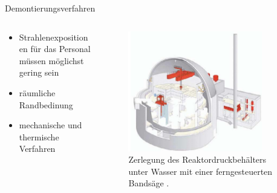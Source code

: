 \begin{frame}{Demontierungsverfahren}
  \begin{columns}

    \begin{column}{0.48\textwidth}
    \begin{itemize}
      \setlength\itemsep{1.2em}
      \item{Strahlenexpositionen für das Personal müssen möglichst gering sein }
      \item{ räumliche Randbedinung }
      \item{ mechanische und thermische Verfahren }

    \end{itemize}

    \end{column}

    \begin{column}{0.48\textwidth}
      \begin{figure}
         \centering
         \includegraphics[width=0.85\textwidth]{./bilder/abbau_schritt_4.PNG}
         \caption{Zerlegung des Reaktordruckbehälters unter Wasser mit einer ferngesteuerten Bandsäge \cite{stilllegung_grs}. }
         \label{ fig: abbau_roboter}
       \end{figure}
    \end{column}

  \end{columns}
\end{frame}




